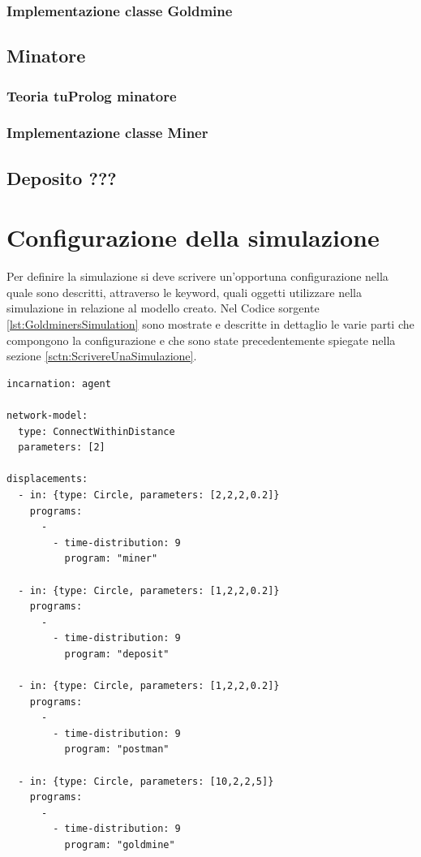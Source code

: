 \subsubsection{Implementazione classe Goldmine}



\subsection{Minatore}

\subsubsection{Teoria tuProlog minatore}

\subsubsection{Implementazione classe Miner}




\subsection{Deposito ???}





\section{Configurazione della simulazione}
Per definire la simulazione si deve scrivere un'opportuna configurazione nella quale sono descritti, attraverso le keyword, quali oggetti utilizzare nella simulazione in relazione al modello creato. Nel Codice sorgente \ref{lst:GoldminersSimulation} sono mostrate e descritte in dettaglio le varie parti che compongono la configurazione e che sono state precedentemente spiegate nella sezione \ref{sctn:ScrivereUnaSimulazione}.

\medskip
\begin{lstlisting}[firstnumber=1,label={lst:GoldminersSimulation},caption={Configurazione simulazione Goldminers}]
incarnation: agent

network-model:
  type: ConnectWithinDistance
  parameters: [2]

displacements:
  - in: {type: Circle, parameters: [2,2,2,0.2]}
    programs:
      -
        - time-distribution: 9
          program: "miner"

  - in: {type: Circle, parameters: [1,2,2,0.2]}
    programs:
      -
        - time-distribution: 9
          program: "deposit"

  - in: {type: Circle, parameters: [1,2,2,0.2]}
    programs:
      -
        - time-distribution: 9
          program: "postman"

  - in: {type: Circle, parameters: [10,2,2,5]}
    programs:
      -
        - time-distribution: 9
          program: "goldmine"
\end{lstlisting}

